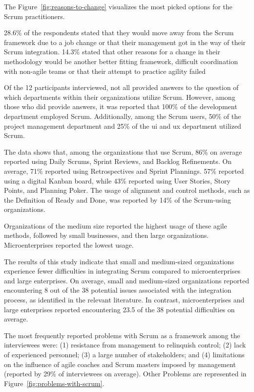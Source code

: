 The Figure~\ref{fig:reasons-to-change} visualizes the most picked options for the Scrum practitioners. 

28.6\% of the respondents stated that they would move away from the Scrum \gls{framework} due to a job change or that their management got in the way of their Scrum integration. 14.3\% stated that other reasons for a change in their \gls{methodology} would be another better fitting \gls{framework}, difficult coordination with non-agile teams or that their attempt to practice agility failed

Of the 12 participants interviewed, not all provided answers to the question of which departments within their organizations utilize Scrum. However, among those who did provide answers, it was reported that 100\% of the development department employed Scrum. Additionally, among the Scrum users, 50\% of the project management department and 25\% of the \ac{ui} and \ac{ux} department utilized Scrum. 

The data shows that, among the organizations that use Scrum, 86\% on average reported using Daily Scrums, Sprint Reviews, and Backlog Refinements. On average, 71\% reported using Retrospectives and Sprint Plannings. 57\% reported using a digital Kanban board, while 43\% reported using User Stories, Story Points, and Planning Poker. The usage of alignment and control \glspl{method}, such as the Definition of Ready and Done, was reported by 14\% of the Scrum-using organizations.

Organizations of the medium size reported the highest usage of these \gls{agile} \glspl{method}, followed by small businesses, and then large organizations. Microenterprises reported the lowest usage.

The results of this study indicate that small and medium-sized organizations experience fewer difficulties in integrating Scrum compared to microenterprises and large enterprises. On average, small and medium-sized organizations reported encountering 8 out of the 38 potential issues associated with the integration process, as identified in the relevant literature. In contrast, microenterprises and large enterprises reported encountering 23.5 of the 38 potential difficulties on average. 

The most frequently reported problems with Scrum as a \gls{framework} among the interviewees were: (1) resistance from management to relinquish control; (2) lack of experienced personnel; (3) a large number of stakeholders; and (4) limitations on the influence of \gls{agile} coaches and Scrum masters imposed by management (reported by 29\% of interviewees on average). Other Problems are represented in Figure~\ref{fig:problems-with-scrum}.


